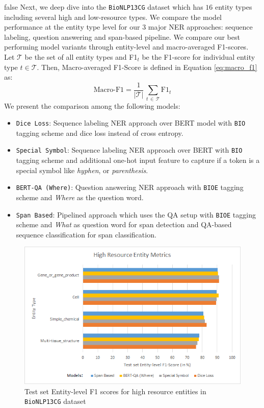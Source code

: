 \if false
Next, we deep dive into the \texttt{BioNLP13CG} dataset which has $16$ entity types including several high and low-resource types. We compare the model performance at the entity type level for our 3 major NER approaches: sequence labeling, question answering and span-based pipeline. We compare our best performing model variants through entity-level and macro-averaged F1-scores. Let $\mathcal{T}$ be the set of all entity types and F1$_t$ be the F1-score for individual entity type $t \in \mathcal{T}$. Then, Macro-averaged F1-Score is defined in Equation \ref{eq:macro_f1} as:
\begin{equation}
\label{eq:macro_f1}
    \text{Macro-F1} = \frac{1}{\mathcal{\vert\mathcal{T}\vert}}\,\sum_{t\,\in\,\mathcal{T}}{\text{F1}_t}
\end{equation}
We present the comparison among the following models:
\begin{itemize}
    \item \texttt{Dice Loss}: Sequence labeling NER approach over BERT model with \texttt{BIO} tagging scheme and dice loss instead of cross entropy.

    \item \texttt{Special Symbol}: Sequence labeling NER approach over BERT with \texttt{BIO} tagging scheme and additional one-hot input feature to capture if a token is a special symbol like \textit{hyphen}, or \textit{parenthesis}.

    \item \texttt{BERT-QA (Where)}: Question answering NER approach with \texttt{BIOE} tagging scheme and \textit{Where} as the question word.

    \item \texttt{Span Based}: Pipelined approach which uses the QA setup with \texttt{BIOE} tagging scheme and \textit{What} as question word for span detection and QA-based sequence classification for span classification.
\end{itemize}

\begin{figure}
    \centering
    \includegraphics[scale=0.5]{../thesis/high_resource_entity_metrics}
    \caption{Test set Entity-level F1 scores for high resource entities in \texttt{BioNLP13CG} dataset}
    \label{fig:high_resource_entity_metrics}
\end{figure}

